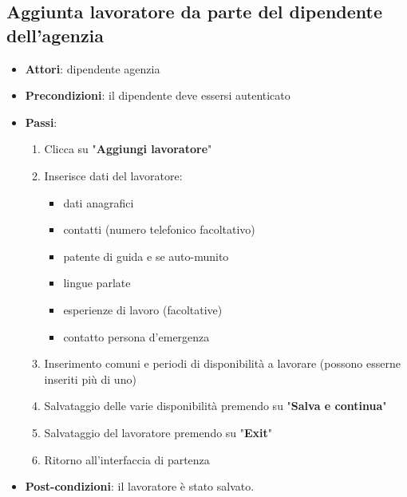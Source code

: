 \documentclass{article}
\begin{document}
    \subsection{Aggiunta lavoratore da parte del dipendente dell'agenzia}

    \begin{framed}{}
        \begin{itemize}
            \item[] \textbf{Attori}: dipendente agenzia
            \item[] \textbf{Precondizioni}: il dipendente deve essersi autenticato
            \item[] \textbf{Passi}: \begin{enumerate}
                \item Clicca su "\textbf{Aggiungi lavoratore}"
                \item Inserisce dati del lavoratore:
                \begin{itemize}
                    \item dati anagrafici
                    \item contatti (numero telefonico facoltativo)
                    \item patente di guida e se auto-munito
                    \item lingue parlate
                    \item esperienze di lavoro (facoltative)
                    \item contatto persona d'emergenza
                \end{itemize}
                \item Inserimento comuni e periodi di disponibilità a lavorare (possono esserne inseriti più di uno)
                \item Salvataggio delle varie disponibilità premendo su "\textbf{Salva e continua}"
                \item Salvataggio del lavoratore premendo su "\textbf{Exit}"
                \item Ritorno all'interfaccia di partenza
            \end{enumerate}
            \item[] \textbf{Post-condizioni}: il lavoratore è stato salvato.
        \end{itemize}
    \end{framed}

    
\end{document}
